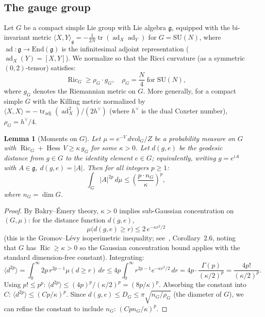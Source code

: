 \documentclass[11pt,a4paper]{article}
\theoremstyle{plain}
\newtheorem{lemma}[theorem]{Lemma}
\theoremstyle{definition}
\theoremstyle{remark}
\newcommand{\tr}{\operatorname{tr}}
\newcommand{\ad}{\operatorname{ad}}
\newcommand{\Hess}{\operatorname{Hess}}
\newcommand{\Ric}{\operatorname{Ric}}
\newcommand{\SU}{\mathrm{SU}}
\newcommand{\fg}{\mathfrak{g}}
\begin{document}
\subsection{The gauge group}\label{ssec:gauge_group}

Let $G$ be a compact simple Lie group with Lie algebra
$\fg$, equipped with the bi-invariant metric
$\langle X, Y \rangle_\fg = -\frac{1}{2N}\tr(\ad_X \ad_Y)$
for $G = \SU(N)$, where $\ad : \fg \to \mathrm{End}(\fg)$
is the infinitesimal adjoint representation
($\ad_X(Y) = [X, Y]$). We normalize so that
the Ricci curvature (as a symmetric $(0,2)$-tensor)
satisfies:
\begin{equation}\label{eq:ricci_G}
  \Ric_G \ge \rho_G \cdot g_G, \quad
  \rho_G = \frac{N}{4} \;\text{for } \SU(N),
\end{equation}
where $g_G$ denotes the Riemannian metric on $G$.
More generally, for a compact simple $G$ with the
Killing metric normalized by $\langle X, X \rangle
= -\tr_{\mathrm{adj}}(\ad_X^2)/(2h^\vee)$ (where
$h^\vee$ is the dual Coxeter number),
$\rho_G = h^\vee/4$.

\begin{lemma}[Moments on $G$]\label{lem:moments_G}
Let $\mu = e^{-V}\,d\mathrm{vol}_G / Z$ be a
probability measure on $G$ with $\Ric_G + \Hess\,V
\ge \kappa\,g_G$ for some $\kappa > 0$. Let
$d(g, e)$ be the geodesic distance from $g \in G$
to the identity element $e \in G$; equivalently, writing
$g = e^{iA}$ with $A \in \fg$, $d(g, e) = |A|$.
Then for all integers $p \ge 1$:
\begin{equation}\label{eq:moment_bound}
  \int_G |A|^{2p}\,d\mu \le
  \left(\frac{p \cdot n_G}{\kappa}\right)^p,
\end{equation}
where $n_G = \dim G$.
\end{lemma}

\begin{proof}
By Bakry--\'Emery theory, $\kappa > 0$ implies
sub-Gaussian concentration on $(G, \mu)$: for the
distance function $d(g, e)$,
\begin{equation}
  \mu\bigl(d(g,e) \ge r\bigr) \le 2\,e^{-\kappa r^2/2}
\end{equation}
(this is the Gromov--L\'evy
isoperimetric inequality; see~\cite{Ledoux},
Corollary~2.6, noting that $G$ has $\Ric \ge \kappa > 0$
so the Gaussian concentration bound applies with the
standard dimension-free constant). Integrating:
\begin{equation}
  \langle d^{2p} \rangle
  = \int_0^\infty 2p\,r^{2p-1}\mu(d \ge r)\,dr
  \le 4p \int_0^\infty r^{2p-1}
  e^{-\kappa r^2/2}\,dr
  = 4p \cdot \frac{\Gamma(p)}{(\kappa/2)^p}
  = \frac{4p!}{(\kappa/2)^p}.
\end{equation}
Using $p! \le p^p$:
$\langle d^{2p}\rangle \le (4p)^p / (\kappa/2)^p
= (8p/\kappa)^p$.
Absorbing the constant into $C$:
$\langle d^{2p}\rangle \le (Cp/\kappa)^p$.
Since $d(g,e) \le D_G \le \pi\sqrt{n_G/\rho_G}$
(the diameter of $G$), we can refine the constant to
include $n_G$: $(Cpn_G/\kappa)^p$.
\end{proof}
\end{document}
